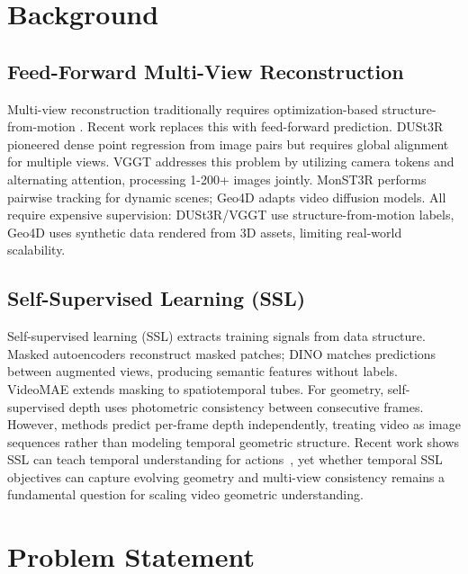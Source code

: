 \documentclass{article}
\begin{document}
\vspace{-0.5cm}
\section{Background}
\vspace{-0.5cm}

\subsection{Feed-Forward Multi-View Reconstruction}

Multi-view reconstruction traditionally requires optimization-based structure-from-motion 
\cite{sfm}. Recent work replaces this with feed-forward prediction. 
DUSt3R \cite{DUSt3R} pioneered dense point regression from image pairs but requires 
global alignment for multiple views. VGGT \cite{vggt} addresses this problem by utilizing camera tokens 
and alternating attention, processing 1-200+ images jointly. MonST3R \cite{MonST3R} 
performs pairwise tracking for dynamic scenes; Geo4D \cite{geo4d} adapts video diffusion 
models. All require expensive supervision: DUSt3R/VGGT use structure-from-motion labels, 
Geo4D uses synthetic data rendered from 3D assets, limiting real-world scalability.

\vspace{-0.5cm}
\subsection{Self-Supervised Learning (SSL)}

Self-supervised learning (SSL) extracts training signals from data structure. Masked 
autoencoders \cite{mae} reconstruct masked patches; DINO \cite{dino,dinov2} matches 
predictions between augmented views, producing semantic features without labels. 
VideoMAE \cite{videomae} extends masking to spatiotemporal tubes. For geometry, 
self-supervised depth \cite{godard2019,watson2021} uses photometric consistency between 
consecutive frames. However, methods predict per-frame depth independently, treating video as image sequences 
rather than modeling temporal geometric structure. Recent work shows SSL can teach temporal understanding for 
actions~\cite{chirality}, yet whether temporal SSL objectives can capture evolving geometry and multi-view 
consistency remains a fundamental question for scaling video geometric understanding.


\section{Problem Statement}
\end{document}
